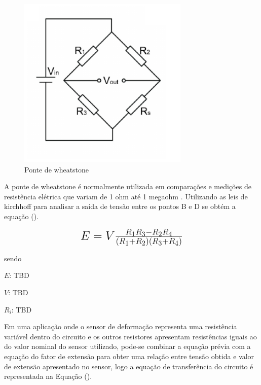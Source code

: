 \begin{figure}[htb]
	\caption{\label{fig:1090} Ponte de wheatstone}
	\begin{center}
		\includegraphics[width=\textwidth]{pictures/1090.png}
	\end{center}
\end{figure}

A ponte de wheatstone é normalmente utilizada em comparações e medições de resistência elétrica que variam de 1 ohm até 1 megaohm \autocite{Hollman2011}. Utilizando as leis de kirchhoff para analisar a saída de tensão entre os pontos B e D se obtém a equação ().

\begin{equation}\label{eq:Eq_220}%
\mbox{\fontsize{17.28}{21.6}\selectfont\( %
E = V \frac{R_1R_3 - R_2R_4}{(R_1+R_2)(R_3+R_4)}
\)} %
\end{equation}

sendo

$E$: TBD

$V$: TBD

$R_i$: TBD

\hfill

Em uma aplicação onde o sensor de deformação representa uma resistência variável dentro do circuito e os outros resistores apresentam resistências iguais ao do valor nominal do sensor utilizado, pode-se combinar a equação prévia com a equação do fator de extensão para obter uma relação entre tensão obtida e valor de extensão apresentado no sensor, logo a equação de transferência do circuito é representada na Equação ().

